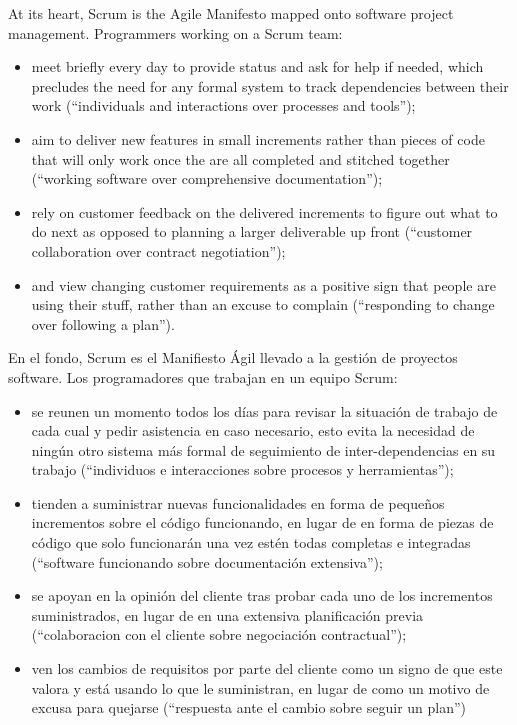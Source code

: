 \documentclass[spanish,12pt,a4paper,final,oneside]{book}
\begin{document}
At its heart, Scrum is the Agile Manifesto mapped onto software project management. Programmers working on a Scrum team:
\begin{itemize}
\item meet briefly every day to provide status and ask for help if needed, which precludes the need for any formal system to track dependencies between their work (``individuals and interactions over processes and tools''); 
\item aim to deliver new features in small increments rather than pieces of code that will only work once the are all completed and stitched together (``working software over comprehensive documentation''); 
\item rely on customer feedback on the delivered increments to figure out what to do next as opposed to planning a larger deliverable up front (``customer collaboration over contract negotiation''); 
\item and view changing customer requirements as a positive sign that people are using their stuff, rather than an excuse to complain (``responding to change over following a plan'').
\end{itemize}

En el fondo, Scrum es el Manifiesto Ágil llevado a la gestión de proyectos software. Los programadores que trabajan en un equipo Scrum:
\begin{itemize}
\item se reunen un momento todos los días para revisar la situación de trabajo de cada cual y pedir asistencia en caso necesario, esto evita la necesidad de ningún otro sistema más formal de seguimiento de inter-dependencias en su trabajo (``individuos e interacciones sobre procesos y herramientas'');
\item tienden a suministrar nuevas funcionalidades en forma de pequeños incrementos sobre el código funcionando, en lugar de en forma de piezas de código que solo funcionarán una vez estén todas completas e integradas (``software funcionando sobre documentación extensiva'');
\item se apoyan en la opinión del cliente tras probar cada uno de los incrementos suministrados, en lugar de en una extensiva planificación previa (``colaboracion con el cliente sobre negociación contractual'');
\item ven los cambios de requisitos por parte del cliente como un signo de que este valora y está usando lo que le suministran, en lugar de como un motivo de excusa para quejarse (``respuesta ante el cambio sobre seguir un plan'')
\end{itemize}
\end{document}
